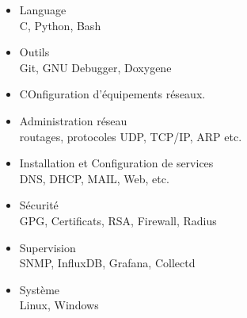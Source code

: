 



















\begin{itemize}
    \item Language\\
        C, Python, Bash
    \item Outils\\
        Git, GNU Debugger, Doxygene
    
\end{itemize}{}



\begin{itemize}
    \item COnfiguration d'équipements réseaux.
    \item Administration réseau\\
    routages, protocoles UDP, TCP/IP, ARP etc.
    \item Installation et Configuration de services\\
    DNS, DHCP, MAIL, Web, etc. 
    \item Sécurité \\
    GPG, Certificats, RSA, Firewall, Radius
    \item Supervision\\
    SNMP, InfluxDB, Grafana, Collectd
    \item Système\\
    Linux, Windows
\end{itemize}



